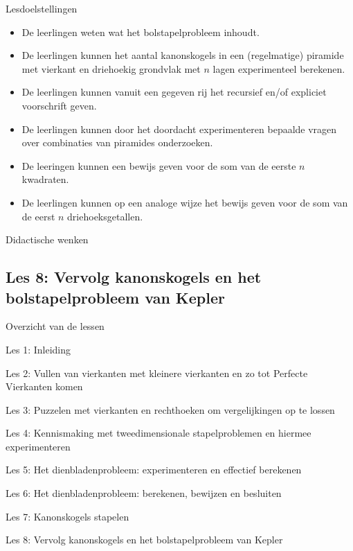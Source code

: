 \documentclass[dutch]{beamer}
\begin{document}
\begin{frame}{Lesdoelstellingen}
\begin{itemize}
\item De leerlingen weten wat het bolstapelprobleem inhoudt.
\item De leerlingen kunnen het aantal kanonskogels in een (regelmatige) piramide met vierkant en driehoekig grondvlak met $n$ lagen experimenteel berekenen.
\item De leerlingen kunnen vanuit een gegeven rij het recursief en/of expliciet voorschrift geven.
\item De leerlingen kunnen door het doordacht experimenteren bepaalde vragen over combinaties van piramides onderzoeken.
\item De leeringen kunnen een bewijs geven voor de som van de eerste $n$ kwadraten.
\item De leerlingen kunnen op een analoge wijze het bewijs geven voor de som van de eerst $n$ driehoeksgetallen.
\end{itemize}
\end{frame}

\begin{frame}{Didactische wenken}
\end{frame}


\subsection{Les 8: Vervolg kanonskogels en het bolstapelprobleem van Kepler}
\begin{frame}
{Overzicht van de lessen}
\begin{list}{\quad}{}
\item Les 1: Inleiding
\item Les 2: Vullen van vierkanten met kleinere vierkanten en zo tot Perfecte Vierkanten komen
\item Les 3: Puzzelen met vierkanten en rechthoeken om vergelijkingen op te lossen
\item Les 4: Kennismaking met tweedimensionale stapelproblemen en hiermee experimenteren
\item Les 5: Het dienbladenprobleem: experimenteren en effectief berekenen
\item Les 6: Het dienbladenprobleem: berekenen, bewijzen en besluiten
\item Les 7: Kanonskogels stapelen
\item {\color{blue}Les 8: Vervolg kanonskogels en het bolstapelprobleem van Kepler}
\end{list}
\end{frame}
\end{document}
